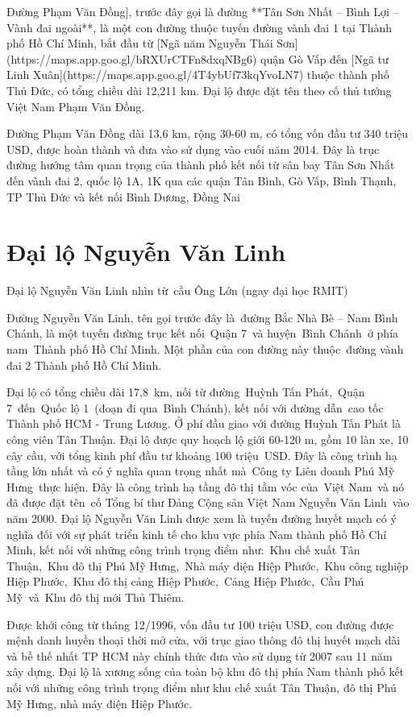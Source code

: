 Đường Phạm Văn Đồng], trước đây gọi là đường **Tân Sơn Nhất – Bình Lợi – Vành đai ngoài**, là một con đường thuộc tuyến đường vành đai 1 tại Thành phố Hồ Chí Minh, bắt đầu từ [Ngã năm Nguyễn Thái Sơn](https://maps.app.goo.gl/bRXUrCTFn8dxqNBg6) quận Gò Vấp đến [Ngã tư Linh Xuân](https://maps.app.goo.gl/4T4ybUf73kqYvoLN7) thuộc thành phố Thủ Đức, có tổng chiều dài 12,211 km. Đại lộ được đặt tên theo cố thủ tướng Việt Nam Phạm Văn Đồng.

Đường Phạm Văn Đồng dài 13,6 km, rộng 30-60 m, có tổng vốn đầu tư 340 triệu USD, được hoàn thành và đưa vào sử dụng vào cuối năm 2014. Đây là trục đường hướng tâm quan trọng của thành phố kết nối từ sân bay Tân Sơn Nhất đến vành đai 2, quốc lộ 1A, 1K qua các quận Tân Bình, Gò Vấp, Bình Thạnh, TP Thủ Đức và kết nối Bình Dương, Đồng Nai

\section{Đại lộ Nguyễn Văn Linh}

Đại lộ Nguyễn Văn Linh nhìn từ cầu Ông Lớn (ngay đại học RMIT)

Đường Nguyễn Văn Linh, tên gọi trước đây là đường Bắc Nhà Bè – Nam Bình Chánh, là một tuyến đường trục kết nối Quận 7 và huyện Bình Chánh ở phía nam Thành phố Hồ Chí Minh. Một phần của con đường này thuộc đường vành đai 2 Thành phố Hồ Chí Minh.

Đại lộ có tổng chiều dài 17,8 km, nối từ đường Huỳnh Tấn Phát, Quận 7 đến Quốc lộ 1 (đoạn đi qua Bình Chánh), kết nối với đường dẫn cao tốc Thành phố HCM - Trung Lương. Ở phí đầu giao với đường Huỳnh Tấn Phát là công viên Tân Thuận.
Đại lộ được quy hoạch lộ giới 60-120 m, gồm 10 làn xe, 10 cây cầu, với tổng kinh phí đầu tư khoảng 100 triệu USD. Đây là công trình hạ tầng lớn nhất và có ý nghĩa quan trọng nhất mà Công ty Liên doanh Phú Mỹ Hưng thực hiện.
Đây là công trình hạ tầng đô thị tầm vóc của Việt Nam và nó đã được đặt tên cố Tổng bí thư Đảng Cộng sản Việt Nam Nguyễn Văn Linh vào năm 2000.
Đại lộ Nguyễn Văn Linh được xem là tuyến đường huyết mạch có ý nghĩa đối với sự phát triển kinh tế cho khu vực phía Nam thành phố Hồ Chí Minh, kết nối với những công trình trọng điểm như: Khu chế xuất Tân Thuận, Khu đô thị Phú Mỹ Hưng, Nhà máy điện Hiệp Phước, Khu công nghiệp Hiệp Phước, Khu đô thị cảng Hiệp Phước, Cảng Hiệp Phước, Cầu Phú Mỹ và Khu đô thị mới Thủ Thiêm.

Được khởi công từ tháng 12/1996, vốn đầu tư 100 triệu USD, con đường được mệnh danh huyền thoại thời mở cửa, với trục giao thông đô thị huyết mạch dài và bề thế nhất TP HCM này chính thức đưa vào sử dụng từ 2007 sau 11 năm xây dựng. Đại lộ là xương sống của toàn bộ khu đô thị phía Nam thành phố kết nối với những công trình trọng điểm như khu chế xuất Tân Thuận, đô thị Phú Mỹ Hưng, nhà máy điện Hiệp Phước.

